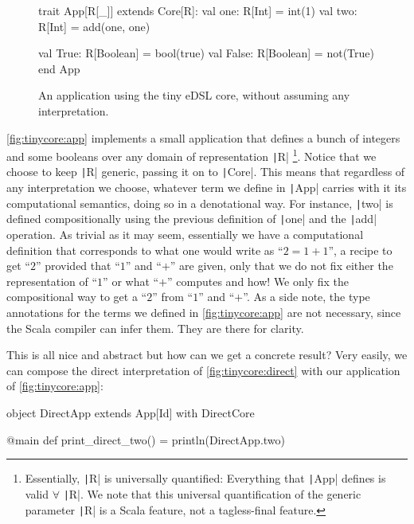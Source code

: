 \documentclass[11pt]{article}
\renewcommand{\vref}[1]{\autoref{#1} \vpageref{#1}}{}
\newcommand{\ScalaI}[1]{\texttt|#1|}
\begin{document}
\begin{figure}[t]
\begin{ScalaBlock}
trait App[R[_]] extends Core[R]:
  val one: R[Int] = int(1)
  val two: R[Int] = add(one, one)
  
  val True: R[Boolean] = bool(true)
  val False: R[Boolean] = not(True)
end App
\end{ScalaBlock}
\caption{An application using the tiny eDSL core, without assuming any interpretation.}
\label{fig:tinycore:app}
\hrulefill
\end{figure}

\vref{fig:tinycore:app} implements a small application that defines a bunch of integers and some booleans over any domain of representation \ScalaI{R}%
\footnote{Essentially, \ScalaI{R} is universally quantified: Everything that \ScalaI{App} defines is valid $\forall$ \ScalaI{R}. We note that this universal quantification of the generic parameter \ScalaI{R} is a Scala feature, not a tagless-final feature.}. Notice that we choose to keep \ScalaI{R} generic, passing it on to \ScalaI{Core}. This means that regardless of any interpretation we choose, whatever term we define in \ScalaI{App} carries with it its computational semantics, doing so in a denotational way. For instance, \ScalaI{two} is defined compositionally using the previous definition of \ScalaI{one} and the \ScalaI{add} operation. As trivial as it may seem, essentially we have a computational definition that corresponds to what one would write as ``$2 = 1 + 1$'', a recipe to get ``$2$'' provided that ``$1$'' and ``$+$'' are given, only that we do not fix either the representation of ``$1$'' or what ``$+$'' computes and how! We only fix the compositional way to get a ``$2$'' from ``$1$'' and ``$+$''. As a side note, the type annotations for the terms we defined in \autoref{fig:tinycore:app} are not necessary, since the Scala compiler can infer them. They are there for clarity.

This is all nice and abstract but how can we get a concrete result? Very easily, we can compose the direct interpretation of \autoref{fig:tinycore:direct} with our application of \autoref{fig:tinycore:app}:

\begin{ScalaBlockSimple}
object DirectApp extends App[Id] with DirectCore

@main def print_direct_two() = println(DirectApp.two)
\end{ScalaBlockSimple}
\end{document}
